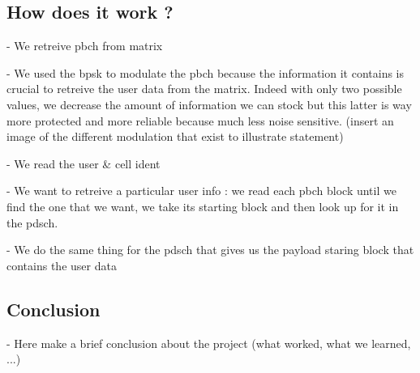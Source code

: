 \documentclass[a4paper, 12pt, twoside]{article}
\begin{document}
    \begin{indt}{\section{How does it work ?}}%
        - We retreive pbch from matrix

        - We used the bpsk to modulate the pbch because the information it contains is crucial to retreive the user data from the matrix. Indeed with only two possible values, we decrease the amount of information we can stock but this latter is way more protected and more reliable because much less noise sensitive. (insert an image of the different modulation that exist to illustrate statement)

        - We read the user \& cell ident

        - We want to retreive a particular user info : we read each pbch block until we find the one that we want, we take its starting block and then look up for it in the pdsch.

        - We do the same thing for the pdsch that gives us the payload staring block that contains the user data
    \end{indt}%

    \begin{indt}{\section{Conclusion}}%
        - Here make a brief conclusion about the project (what worked, what we learned, ...)
    \end{indt}%
    
\end{document}
